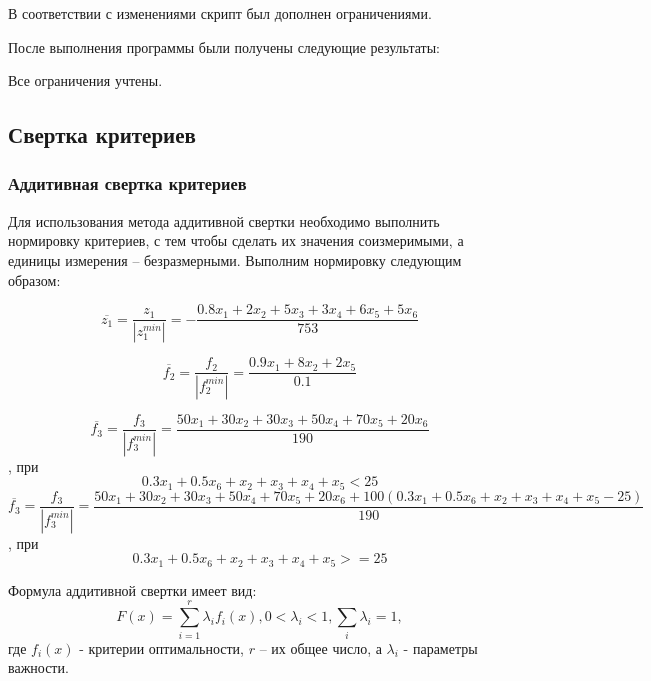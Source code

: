 \documentclass[14pt,a4paper,report]{report}
\begin{document}
В соответствии с изменениями скрипт был дополнен ограничениями.


После выполнения программы были получены следующие результаты:


Все ограничения учтены.



















\subsection{Свертка критериев}
\subsubsection{Аддитивная свертка критериев}
Для использования метода аддитивной свертки необходимо выполнить нормировку критериев, с тем чтобы сделать их значения соизмеримыми, а единицы измерения – безразмерными. Выполним нормировку следующим образом:
    
    
\begin{equation}
\overline{z_1} = \frac{z_1}{|z_1^{min}|} = - \frac{0.8x_1+2x_2+5x_3+3x_4+6x_5+5x_6}{753} 
\end{equation}

\begin{equation}
\overline{f_2} = \frac{f_2}{|f_2^{min}|}= \frac{0.9x_1+8x_2+2x_5}{0.1}
\end{equation}

\begin{equation}
\overline{f_3} = \frac{f_3}{|f_3^{min}|} = \frac{50x_1+30x_2+30x_3+50x_4+70x_5+20x_6}{190} 
\end{equation}
, при  $$0.3x_1+0.5x_6+x_2+x_3+x_4+x_5<25$$
\begin{equation}
\overline{f_3} = \frac{f_3}{|f_3^{min}|} = \frac{50x_1+30x_2+30x_3+50x_4+70x_5+20x_6+100(0.3x_1+0.5x_6+x_2+x_3+x_4+x_5-25)}{190} 
\end{equation}
, при $$0.3x_1+0.5x_6+x_2+x_3+x_4+x_5>=25$$

Формула аддитивной свертки имеет вид:
\begin{equation}
F(x) = \sum_{i=1}^{r}\lambda_i f_i(x), 0<\lambda_i<1, \sum_i^{}\lambda_i=1,
\end{equation}
где $f_i(x)$ - критерии оптимальности, $r$ – их общее число, а $\lambda_i$ - параметры важности. 
\end{document}
